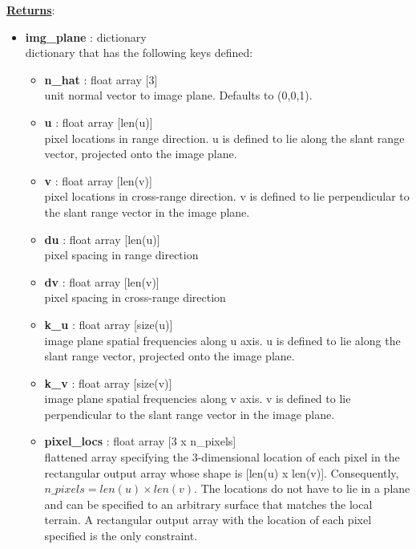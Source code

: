 \documentclass{article}
\newcommand{\defs}[2]{\textbf{{#1}} : {#2}}
\begin{document}
\noindent \underline{\textbf{Returns}}:
\begin{itemize}
	  	\item \defs{img\_plane}{dictionary}\\
	  	dictionary that has the following keys defined:
		\begin{itemize}
			\item\defs{n\_hat}{float array [3]}\\
				unit normal vector to image plane.  Defaults to (0,0,1).
			\item \defs{u}{float array [len(u)]}\\
		    	pixel locations in range direction.  u is defined to lie along the slant range vector, projected onto the image plane.
			\item \defs{v}{float array [len(v)]}\\
		    	pixel locations in cross-range direction.  v is defined to lie perpendicular to the slant range vector in the image plane.
			\item \defs{du}{float array [len(u)]}\\
		    	pixel spacing in range direction
			\item \defs{dv}{float array [len(v)]}\\
		    	pixel spacing in cross-range direction
		    \item \defs{k\_u}{float array [size(u)]}\\
		    	image plane spatial frequencies along u axis.  u is defined to lie along the slant range vector, projected onto the image plane.
		    \item \defs{k\_v}{float array [size(v)]}\\
		    	image plane spatial frequencies along v axis.  v is defined to lie perpendicular to the slant range vector in the image plane.
		    \item \defs{pixel\_locs}{float array [3 x n\_pixels]}\\
		    	flattened array specifying the 3-dimensional location of each pixel in the rectangular output array whose shape is [len(u) x len(v)].  Consequently, $n\_pixels = len(u) \times len(v)$.  The locations do not have to lie in a plane and can be specified to an arbitrary surface that matches the local terrain.  A rectangular output array with the location of each pixel specified is the only constraint.
		\end{itemize}
\end{itemize}

\newpage
\end{document}
